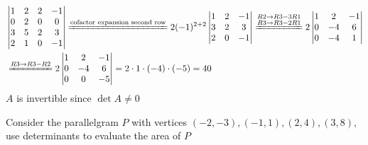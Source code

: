 \documentclass[a4paper,10pt]{article}
\begin{document}
\begin{solution}
\begin{align*}
&\left|\begin{matrix}
1&2&2&-1\\
0&2&0&0\\
3&5&2&3\\
2&1&0&-1
\end{matrix}\right|\xequal{\text{cofactor expansion second row}}2(-1)^{2+2}\left|\begin{matrix}
1&2&-1\\
3&2&3\\
2&0&-1
\end{matrix}\right|\xequal{\substack{R2\rightarrow R3-3R1\\R3\rightarrow R3-2R1}}2\left|\begin{matrix}
1&2&-1\\
0&-4&6\\
0&-4&1
\end{matrix}\right|\\
&\xequal{R3\rightarrow R3-R2}2\left|\begin{matrix}
1&2&-1\\
0&-4&6\\
0&0&-5
\end{matrix}\right|=2\cdot1\cdot(-4)\cdot(-5)=40
\end{align*}
$A$ is invertible since $\det A\neq0$
\end{solution}

\begin{problem}
Consider the parallelgram $P$ with vertices $(-2,-3),(-1,1),(2,4),(3,8)$, use determinants to evaluate the area of $P$
\end{problem}
\end{document}
